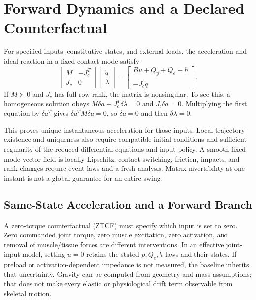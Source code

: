 \section{Forward Dynamics and a Declared Counterfactual}
\label{sec:ztcf_forward_dynamics}

For specified inputs, constitutive states, and external loads, the acceleration
and ideal reaction in a fixed contact mode satisfy
\begin{equation}
 \begin{bmatrix}M&-J_c^T\\J_c&0\end{bmatrix}
 \begin{bmatrix}\ddot q\\\lambda\end{bmatrix}
 =\begin{bmatrix}Bu+Q_{\mathrm{p}}+Q_e-h\\-\dot J_c\dot q\end{bmatrix}.
 \label{eq:forward_wellposed}
\end{equation}
If $M\succ0$ and $J_c$ has full row rank, the matrix is nonsingular. To see
this, a homogeneous solution obeys $M\delta a-J_c^T\delta\lambda=0$ and
$J_c\delta a=0$. Multiplying the first equation by $\delta a^T$ gives
$\delta a^TM\delta a=0$, so $\delta a=0$ and then $\delta\lambda=0$.

This proves unique instantaneous acceleration for those inputs. Local trajectory
existence and uniqueness also require compatible initial conditions and
sufficient regularity of the reduced differential equations and input policy.
A smooth fixed-mode vector field is locally Lipschitz; contact switching,
friction, impacts, and rank changes require event laws and a fresh analysis.
Matrix invertibility at one instant is not a global guarantee for an entire
swing.

\subsection{Same-State Acceleration and a Forward Branch}

A zero-torque counterfactual (ZTCF) must specify which input is set to zero.
Zero commanded joint torque, zero muscle excitation, zero activation, and
removal of muscle/tissue forces are different interventions. In an effective
joint-input model, setting $u=0$ retains the stated $p,Q_e,h$ laws and their
states. If preload or activation-dependent impedance is not measured, the
baseline inherits that uncertainty. Gravity can be computed from geometry and
mass assumptions; that does not make every elastic or physiological drift term
observable from skeletal motion.

